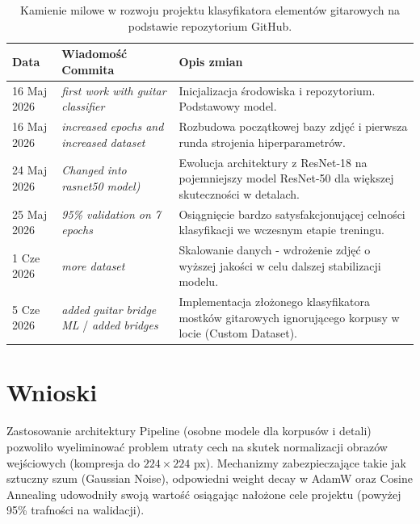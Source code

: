 \documentclass[12pt,a4paper]{article}
\begin{document}
\begin{table}[H]
    \centering
    \begin{tabular}{@{}llp{8cm}@{}}
    \toprule
    \textbf{Data} & \textbf{Wiadomość Commita} & \textbf{Opis zmian} \\ \midrule
    16 Maj 2026 & \textit{first work with guitar classifier} & Inicjalizacja środowiska i repozytorium. Podstawowy model. \\
    16 Maj 2026 & \textit{increased epochs and increased dataset} & Rozbudowa początkowej bazy zdjęć i pierwsza runda strojenia hiperparametrów. \\
    24 Maj 2026 & \textit{Changed into rasnet50 model)} & Ewolucja architektury z ResNet-18 na pojemniejszy model ResNet-50 dla większej skuteczności w detalach. \\
    25 Maj 2026 & \textit{95\% validation on 7 epochs} & Osiągnięcie bardzo satysfakcjonującej celności klasyfikacji we wczesnym etapie treningu. \\
    1 Cze 2026 & \textit{more dataset} & Skalowanie danych - wdrożenie zdjęć o wyższej jakości w celu dalszej stabilizacji modelu. \\
    5 Cze 2026 & \textit{added guitar bridge ML} / \textit{added bridges} & Implementacja złożonego klasyfikatora mostków gitarowych ignorującego korpusy w locie (Custom Dataset). \\ \bottomrule
    \end{tabular}
    \caption{Kamienie milowe w rozwoju projektu klasyfikatora elementów gitarowych na podstawie repozytorium GitHub.}
    \label{tab:commits}
\end{table}

\section{Wnioski}
Zastosowanie architektury Pipeline (osobne modele dla korpusów i detali) pozwoliło wyeliminować problem utraty cech na skutek normalizacji obrazów wejściowych (kompresja do $224\times224$ px). Mechanizmy zabezpieczające takie jak sztuczny szum (Gaussian Noise), odpowiedni weight decay w AdamW oraz Cosine Annealing udowodniły swoją wartość osiągając nałożone cele projektu (powyżej 95\% trafności na walidacji). 
\end{document}
